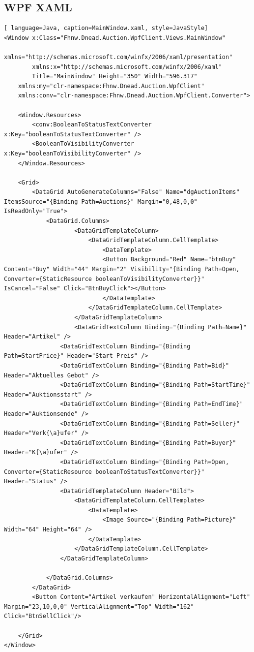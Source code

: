 \documentclass[10pt]{article}
\begin{document}
\subsection{WPF XAML}
\begin{lstlisting}[ language=Java, caption=MainWindow.xaml, style=JavaStyle]
<Window x:Class="Fhnw.Dnead.Auction.WpfClient.Views.MainWindow"
        xmlns="http://schemas.microsoft.com/winfx/2006/xaml/presentation"
        xmlns:x="http://schemas.microsoft.com/winfx/2006/xaml"
        Title="MainWindow" Height="350" Width="596.317"
    xmlns:my="clr-namespace:Fhnw.Dnead.Auction.WpfClient"
    xmlns:conv="clr-namespace:Fhnw.Dnead.Auction.WpfClient.Converter">

    <Window.Resources>
        <conv:BooleanToStatusTextConverter x:Key="booleanToStatusTextConverter" />
        <BooleanToVisibilityConverter x:Key="booleanToVisibilityConverter" />
    </Window.Resources>
    
    <Grid>
        <DataGrid AutoGenerateColumns="False" Name="dgAuctionItems" ItemsSource="{Binding Path=Auctions}" Margin="0,48,0,0" IsReadOnly="True">
            <DataGrid.Columns>
                    <DataGridTemplateColumn>
                        <DataGridTemplateColumn.CellTemplate>
                            <DataTemplate>
                            <Button Background="Red" Name="btnBuy" Content="Buy" Width="44" Margin="2" Visibility="{Binding Path=Open, Converter={StaticResource booleanToVisibilityConverter}}" IsCancel="False" Click="BtnBuyClick"></Button>
                            </DataTemplate>
                        </DataGridTemplateColumn.CellTemplate>
                    </DataGridTemplateColumn>
                    <DataGridTextColumn Binding="{Binding Path=Name}" Header="Artikel" />
                <DataGridTextColumn Binding="{Binding Path=StartPrice}" Header="Start Preis" />
                <DataGridTextColumn Binding="{Binding Path=Bid}" Header="Aktuelles Gebot" />
                <DataGridTextColumn Binding="{Binding Path=StartTime}" Header="Auktionsstart" />
                <DataGridTextColumn Binding="{Binding Path=EndTime}" Header="Auktionsende" />
                <DataGridTextColumn Binding="{Binding Path=Seller}" Header="Verk{\a}ufer" />
                <DataGridTextColumn Binding="{Binding Path=Buyer}" Header="K{\a}ufer" />
                <DataGridTextColumn Binding="{Binding Path=Open, Converter={StaticResource booleanToStatusTextConverter}}" Header="Status" />
                <DataGridTemplateColumn Header="Bild">
                    <DataGridTemplateColumn.CellTemplate>
                        <DataTemplate>
                            <Image Source="{Binding Path=Picture}" Width="64" Height="64" />
                        </DataTemplate>
                    </DataGridTemplateColumn.CellTemplate>
                </DataGridTemplateColumn>

            </DataGrid.Columns>
        </DataGrid>
        <Button Content="Artikel verkaufen" HorizontalAlignment="Left" Margin="23,10,0,0" VerticalAlignment="Top" Width="162" Click="BtnSellClick"/>

    </Grid>
</Window>
\end{lstlisting}
\end{document}
